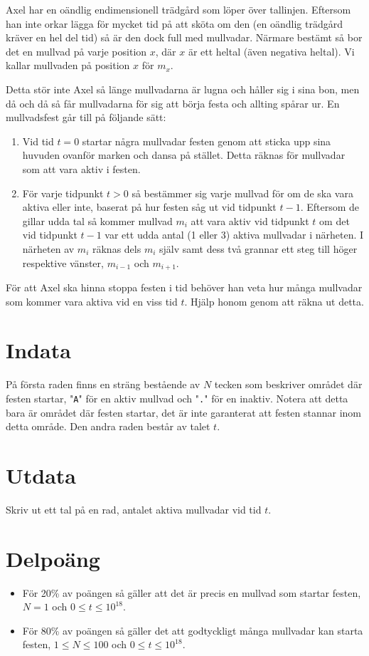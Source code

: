 
Axel har en oändlig endimensionell trädgård som löper över tallinjen. Eftersom han inte orkar lägga för mycket tid på att sköta om den (en oändlig trädgård kräver en hel del tid) så är den dock full med mullvadar. Närmare bestämt så bor det en mullvad på varje position $x$, där $x$ är ett heltal (även negativa heltal). Vi kallar mullvaden på position $x$ för $m_x$.

Detta stör inte Axel så länge mullvadarna är lugna och håller sig i sina bon, men då och då så får mullvadarna för sig att börja festa och allting spårar ur. En mullvadsfest går till på följande sätt:
\begin{enumerate}
\item Vid tid $t=0$ startar några mullvadar festen genom att sticka upp sina huvuden ovanför marken och dansa på stället. Detta räknas för mullvadar som att vara aktiv i festen.
\item För varje tidpunkt $t > 0$ så bestämmer sig varje mullvad för om de ska vara aktiva eller inte, baserat på hur festen såg ut vid tidpunkt $t-1$. Eftersom de gillar udda tal så kommer mullvad $m_i$ att vara aktiv vid tidpunkt $t$ om det vid tidpunkt $t-1$ var ett udda antal (1 eller 3) aktiva mullvadar i närheten. I närheten av $m_i$ räknas dels $m_i$ själv samt dess två grannar ett steg till höger respektive vänster, $m_{i-1}$ och $m_{i+1}$.
\end{enumerate}

För att Axel ska hinna stoppa festen i tid behöver han veta hur många mullvadar som kommer vara aktiva vid en viss tid $t$. Hjälp honom genom att räkna ut detta.

\section*{Indata}
På första raden finns en sträng bestående av $N$ tecken som beskriver området där festen startar, "\texttt{A}" för en aktiv mullvad och "\texttt{.}" för en inaktiv. Notera att detta bara är området där festen startar, det är inte garanterat att festen stannar inom detta område. Den andra raden består av talet $t$.

\section*{Utdata}
Skriv ut ett tal på en rad, antalet aktiva mullvadar vid tid $t$.

\section*{Delpoäng}
\begin{itemize}
\item För 20\% av poängen så gäller att det är precis en mullvad som startar festen, $N = 1$ och $0 \leq t \leq 10^{18}$.
\item För 80\% av poängen så gäller det att godtyckligt många mullvadar kan starta festen, $1 \leq N \leq 100$ och $0 \leq t \leq 10^{18}$.
\end{itemize}

